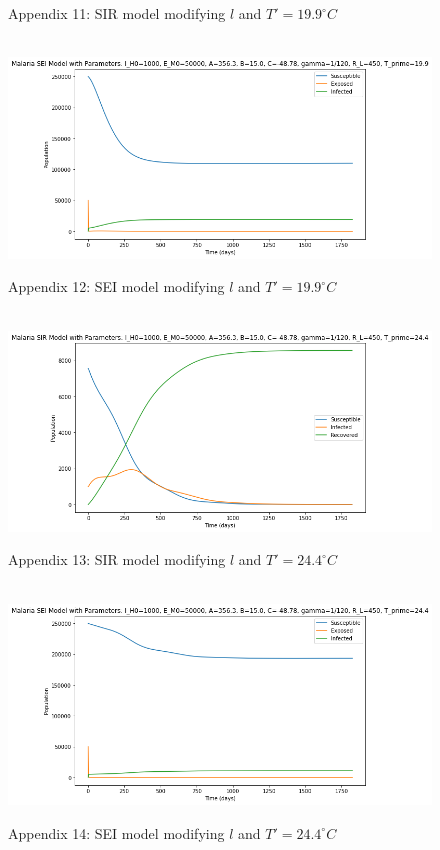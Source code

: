\documentclass[
	12pt,				%
	oneside,			%
	a4paper,			%
	english,			%
	brazil				%
	]{abntex2}
\begin{document}
\begin{apendicesenv}
\begin{figure}[!ht]
	\caption*{Appendix 11: SIR model modifying $l$ and $T'=19.9^\circ C$}
\end{figure} 
\begin{figure}[!ht]
	\centering
	\hbox{\hspace{-1.0em} \includegraphics[scale=0.6] {THESIS-SEI_Correcao_l_b3_T_linha_19_9.png}}
	\caption*{Appendix 12: SEI model modifying $l$ and $T'=19.9^\circ C$}
\end{figure}
\newpage
\begin{figure}[!ht]
	\centering
	\hbox{\hspace{-1.2em} \includegraphics[scale=0.6] {THESIS-SIR_Correcao_l_b3_T_linha_24_4.png}}
	\caption*{Appendix 13: SIR model modifying $l$ and $T'=24.4^\circ C$}
\end{figure} 
\begin{figure}[!ht]
	\centering
	\hbox{\hspace{-1.0em} \includegraphics[scale=0.6] {THESIS-SEI_Correcao_l_b3_T_linha_24_4.png}}
	\caption*{Appendix 14: SEI model modifying $l$ and $T'=24.4^\circ C$}
\end{figure}
\newpage


\end{apendicesenv}
\end{document}

